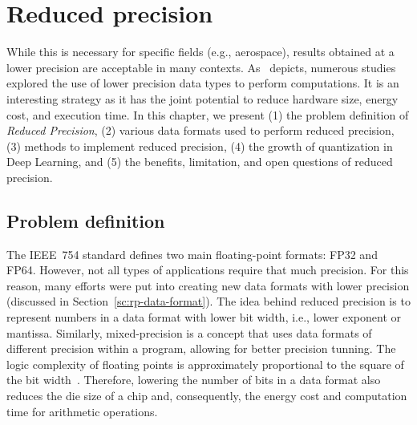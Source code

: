 \chapter{Reduced precision}
\label{ch:reduced-precision}
While this is necessary for specific fields (e.g., aerospace), results obtained at a lower
precision are acceptable in many contexts.
As~\cite{Cherubin2020-tt} depicts, numerous studies explored the use of lower
precision data types to perform computations.
It is an interesting strategy as it has the joint potential to reduce hardware
size, energy cost, and execution time.
In this chapter, we present (1) the problem definition of \textit{Reduced Precision},
(2) various data formats used to perform reduced precision,
(3) methods to implement reduced precision,
(4) the growth of quantization in Deep Learning,
and (5) the benefits, limitation, and open questions of reduced precision.

\section{Problem definition}
\label{sc:rp-problem-definiton}
The IEEE~754 standard defines two main floating-point formats: FP32 and FP64.
However, not all types of applications require that much precision.
For this reason, many efforts were put into creating new data formats with lower precision (discussed in Section~\ref{sc:rp-data-format}).
The idea behind reduced precision is to represent numbers in a data format with
lower bit width, i.e., lower exponent or mantissa.
Similarly, mixed-precision is a concept that uses data formats of different precision within a program, allowing for better precision tunning.
The logic complexity of floating points is approximately proportional to the square of the bit width~\cite{Chen2018-an}.
Therefore, lowering the number of bits in a data format also reduces the die size
of a chip and, consequently, the energy cost and computation time for arithmetic operations.

